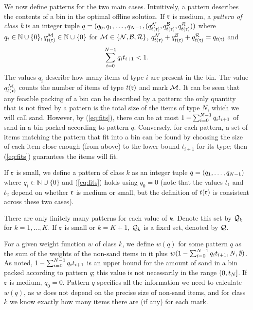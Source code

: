 We now define patterns for the two main cases.
Intuitively, a pattern describes the contents of a bin in the optimal offline solution. 
If $\mathfrak{r}$ is medium, a \emph{pattern of class k} is an integer tuple $q=(q_0,q_1,\dots,q_{N-1},(q_{t(\mathfrak{r})}^{\mathcal{N}},q_{t(\mathfrak{r})}^{\mathcal{B}},q_{t(\mathfrak{r})}^{\mathcal{R}}))$ where $q_i\in \mathbb{N}\cup\{0\}, q_{t(\mathfrak{r})}^{\mathcal{M}} \in \mathbb{N}\cup\{0\}$ for $\mathcal{M} \in \{\mathcal{N},\mathcal{B},\mathcal{R}\}$, $q_{t(\mathfrak{r})}^{\mathcal{N}}+q_{t(\mathfrak{r})}^{\mathcal{B}}+q_{t(\mathfrak{r})}^{\mathcal{R}} = q_{t(\mathfrak{r})}$
and
\begin{equation}
	\label{eq:fits}
	\sum_{i=0}^{N-1} q_it_{i+1}<1.
\end{equation}
The values $q_i$ describe how many items of type $i$ are present in the bin.
The value $q_{t(\mathfrak{r})}^{\mathcal{M}}$ counts the number of items of type $t(\mathfrak{r})$ and mark $\mathcal{M}$. 
It can be seen that any feasible packing of a bin can be described by a pattern: the only quantity that is not 
fixed by a pattern is the total size of the items of type $N$, which we will call sand.
However, by (\ref{eq:fits}), there can be at most $1-\sum_{i=0}^{N-1} q_it_{i+1}$ of sand in a bin
packed according to pattern $q$. Conversely, for each pattern, a set of items matching the pattern
that fit into a bin can be found by choosing the size of each item close enough (from above) to the
lower bound $t_{i+1}$ for its type; then (\ref{eq:fits}) guarantees the items will fit.

If $\mathfrak{r}$ is small, we define a pattern of class $k$ as an integer tuple
$q=(q_1,\dots,q_{N-1})$ where $q_i \in \mathbb{N}\cup\{0\}$ and (\ref{eq:fits}) holds
using $q_0=0$
(note that the values $t_1$ and $t_2$ depend on whether $\mathfrak{r}$ is medium or small,
but the definition of $t(\mathfrak{r})$ is consistent across these two cases).

There are only finitely many patterns for each value of $k$. 
Denote this set by $\mathcal{Q}_{k}$ for $k=1,\dots,K$.
If $\mathfrak{r}$ is small or $k=K+1$, $\mathcal{Q}_{k}$ is a fixed set, denoted by $\mathcal{Q}$.

For a given weight function $w$ of class $k$, 
we define $w(q)$ for some pattern $q$ as the sum of the weights of the non-sand items in it plus
$w(1-\sum_{i=0}^{N-1} q_it_{i+1},N,\emptyset)$. As noted, $1-\sum_{i=0}^{N-1} q_it_{i+1}$
is an upper bound for the amount of sand in a bin packed according to pattern $q$; this 
value is not necessarily in the range $(0,t_N]$. If $\mathfrak{r}$ is medium, $q_0=0$.
Pattern $q$ specifies all the information we need to
calculate $w(q)$, as $w$ does not depend on the precise size of non-sand items, and for class $k$
we know exactly how many items there are (if any) for each mark.

